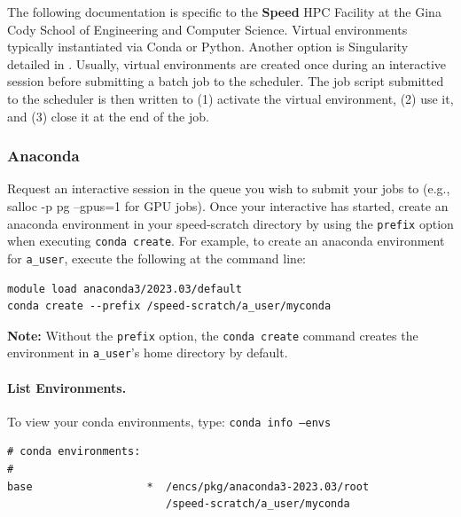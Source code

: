 \label{sect:environments}
\label{sect:examples-venv}

The following documentation is specific to the \textbf{Speed} HPC Facility at the
Gina Cody School of Engineering and Computer Science.
%
Virtual environments typically instantiated via Conda or Python.
Another option is Singularity detailed in .
%
Usually, virtual environments are created once during an interactive session before submitting
a batch job to the scheduler. The job script submitted to the scheduler is then written to 
(1) activate the virtual environment, (2) use it, and (3) close it at the end of the job.

\subsubsection{Anaconda}
\label{sect:conda-venv}

Request an interactive session in the queue you wish to submit your jobs to (e.g., salloc -p pg --gpus=1 for GPU jobs).
Once your interactive has started, create an anaconda environment in your speed-scratch directory by using 
the \texttt{\-\-prefix} option when executing \texttt{conda create}. For example, to create an anaconda environment for 
\texttt{a\_user}, execute the following at the command line:

\begin{verbatim}
module load anaconda3/2023.03/default
conda create --prefix /speed-scratch/a_user/myconda
\end{verbatim}

\vspace{10pt}
\noindent
\textbf{Note:} Without the \texttt{\-\-prefix} option, the \texttt{conda create} command creates the 
environment in \texttt{a\_user}'s home directory by default.
\vspace{10pt}

\paragraph{List Environments.}

To view your conda environments, type: \texttt{conda info --envs}

\begin{verbatim}
# conda environments:
#
base                  *  /encs/pkg/anaconda3-2023.03/root
                         /speed-scratch/a_user/myconda
\end{verbatim}      

